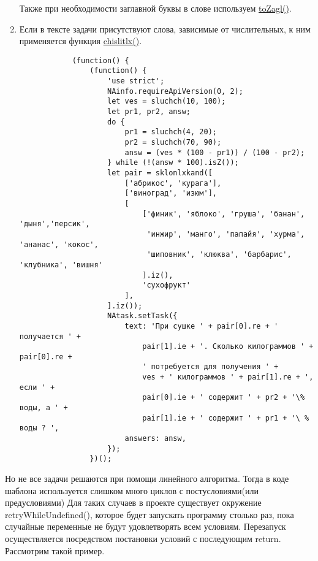 \begin{enumerate}
          Также при необходимости заглавной буквы в слове используем \hyperlink{toZagl}{toZagl()}.
    \item Если в тексте задачи присутствуют слова, зависимые от числительных, к ним применяется функция \hyperlink{chislitlx}{chislitlx()}.
          \begin{lstlisting}
            (function() {
                (function() {
                    'use strict';
                    NAinfo.requireApiVersion(0, 2);
                    let ves = sluchch(10, 100);
                    let pr1, pr2, answ;
                    do {
                        pr1 = sluchch(4, 20);
                        pr2 = sluchch(70, 90);
                        answ = (ves * (100 - pr1)) / (100 - pr2);
                    } while (!(answ * 100).isZ());
                    let pair = sklonlxkand([
                        ['абрикос', 'курага'],
                        ['виноград', 'изюм'],
                        [
                            ['финик', 'яблоко', 'груша', 'банан', 'дыня','персик',
                             'инжир', 'манго', 'папайя', 'хурма', 'ананас', 'кокос',
                             'шиповник', 'клюква', 'барбарис', 'клубника', 'вишня'
                            ].iz(),
                            'сухофрукт'
                        ],
                    ].iz());
                    NAtask.setTask({
                        text: 'При сушке ' + pair[0].re + ' получается ' +
                            pair[1].ie + '. Сколько килограммов ' + pair[0].re +
                            ' потребуется для получения ' +
                            ves + ' килограммов ' + pair[1].re + ', если ' +
                            pair[0].ie + ' содержит ' + pr2 + '\% воды, а ' +
                            pair[1].ie + ' содержит ' + pr1 + '\ % воды ? ',
                        answers: answ,
                    });
                })();       
         \end{lstlisting}
\end{enumerate}

Но не все задачи решаются при помощи линейного алгоритма. Тогда в коде шаблона 
используется слишком много циклов с постусловиями(или предусловиями)
Для таких случаев в проекте существует окружение retryWhileUndefined(), которое 
будет запускать программу столько раз, пока случайные переменные не будут удовлетворять всем условиям.
Перезапуск осуществляется посредством постановки условий с последующим return.
Рассмотрим такой пример.

